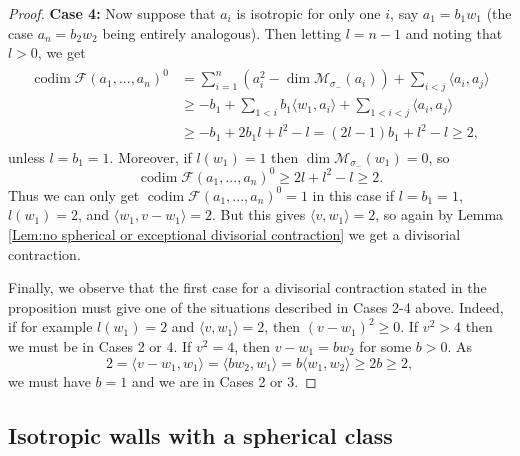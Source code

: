 \documentclass[leqno,11pt]{amsart}
\def\codim{\mathop{\mathrm{codim}}\nolimits}
\def\dim{\mathop{\mathrm{dim}}\nolimits}
\theoremstyle{definition}
\def\FF{\ensuremath{\mathcal F}}
\def\MM{\ensuremath{\mathcal M}}
\begin{document}
\begin{proof}
\textbf{Case 4:} Now suppose that $a_i$ is isotropic for only one $i$, say $a_1=b_1w_1$ (the case $a_n=b_2w_2$ being entirely analogous).  Then letting $l=n-1$ and noting that $l>0$, we get \begin{align}\label{eq:case 4}
\begin{split}
\codim\FF(a_1,...,a_n)^0&=\sum_{i=1}^n(a_i^2-\dim\MM_{\sigma_-}(a_i))+\sum_{i<j}\langle a_i,a_j\rangle\\
&\geq-b_1+\sum_{1<i}b_1\langle w_1,a_i\rangle+\sum_{1<i<j}\langle a_i,a_j\rangle\\
&\geq-b_1+2b_1 l+l^2-l=(2l-1)b_1+l^2-l\geq 2,
\end{split}
\end{align}
unless $l=b_1=1$.  Moreover, if $l(w_1)=1$ then $\dim\MM_{\sigma_-}(w_1)=0$, so $$\codim\FF(a_1,...,a_n)^0\geq 2l+l^2-l\geq 2.$$  Thus we can only get $\codim\FF(a_1,...,a_n)^0=1$ in this case if $l=b_1=1$,$l(w_1)=2$, and $\langle w_1,v-w_1\rangle=2$.  But this gives $\langle v,w_1\rangle=2$, so again by Lemma \ref{Lem:no spherical or exceptional divisorial contraction} we get a divisorial contraction.  

Finally, we observe that the first case for a divisorial contraction stated in the proposition must give one of the situations described in Cases 2-4 above.  Indeed, if for example $l(w_1)=2$ and $\langle v,w_1\rangle=2$, then $(v-w_1)^2\geq 0$.  If $v^2>4$ then we must be in Cases 2 or 4.  If $v^2=4$, then $v-w_1=bw_2$ for some $b>0$.  As $$2=\langle v-w_1,w_1\rangle=\langle bw_2,w_1\rangle=b\langle w_1,w_2\rangle\geq 2b\geq 2,$$ we must have $b=1$ and we are in Cases 2 or 3.
\end{proof}




\subsection{Isotropic walls with a spherical class}
\end{document}
